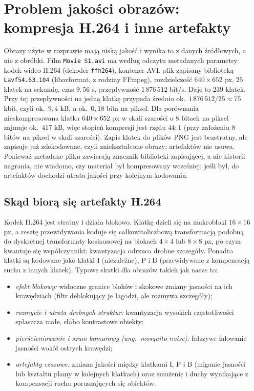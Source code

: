 \documentclass[12pt,a4paper,twoside,openright]{report}
\theoremstyle{definition}
\theoremstyle{remark}
\begin{document}
{\section{Problem jakości obrazów: kompresja H.264 i inne artefakty}
Obrazy użyte w rozprawie mają niską jakość i wynika to z danych źródłowych, a nie z obróbki. Film \texttt{Movie S1.avi} ma według odczytu metadanych parametry: kodek wideo H.264 (dekoder \texttt{ffh264}), kontener AVI, plik zapisany biblioteką \texttt{Lavf54.63.104} (libavformat, z rodziny FFmpeg), rozdzielczość $640\times652$ px, $25$ klatek na sekundę, czas $9{,}56$ s, przepływność $1\,876\,512$ bit/s. Daje to $239$ klatek. Przy tej przepływności na jedną klatkę przypada średnio ok.\ $1\,876\,512/25\approx75$ kbit, czyli ok.\ $9{,}4$ kB, a ok.\ $0{,}18$ bita na piksel. Dla porównania nieskompresowana klatka $640\times652$ px w skali szarości o $8$ bitach na piksel zajmuje ok.\ $417$ kB, więc stopień kompresji jest rzędu $44:1$ (przy założeniu $8$ bitów na piksel w skali szarości). Zapis klatek do plików PNG jest bezstratny, ale zapisuje już zdekodowane, czyli zniekształcone obrazy: artefaktów nie usuwa. Ponieważ metadane pliku zawierają znacznik biblioteki zapisującej, a nie historii nagrania, nie wiadomo, czy materiał był kompresowany wcześniej; jeśli był, do artefaktów dochodzi utrata jakości przy kolejnym kodowaniu.

\subsection{Skąd biorą się artefakty H.264}
Kodek H.264 jest stratny i działa blokowo. Klatkę dzieli się na makrobloki $16\times16$ px, a resztę przewidywania koduje się całkowitoliczbową transformacją podobną do dyskretnej transformaty kosinusowej na blokach $4\times4$ lub $8\times8$ px, po czym kwantuje się współczynniki; kwantyzacja odrzuca drobne szczegóły. Ponadto klatki są kodowane jako klatki I (niezależne), P i B (przewidywane z kompensacją ruchu z innych klatek). Typowe skutki dla obrazów takich jak nasze to:
\begin{itemize}[nosep]
\item \emph{efekt blokowy:} widoczne granice bloków i skokowe zmiany jasności na ich krawędziach (filtr deblokujący je łagodzi, ale rozmywa szczegóły);
\item \emph{rozmycie i utrata drobnych struktur:} kwantyzacja wysokich częstotliwości spłaszcza małe, słabo kontrastowe obiekty;
\item \emph{pierścieniowanie i szum komarowy (ang.\ mosquito noise):} fałszywe falowanie jasności wokół ostrych krawędzi;
\item \emph{artefakty czasowe:} zmiana jakości między klatkami I, P i B (miganie jasności lub kształtu plamy w kolejnych klatkach) oraz smużenie i duchy wynikające z kompensacji ruchu poruszających się obiektów.
\end{itemize}

}
\end{document}
